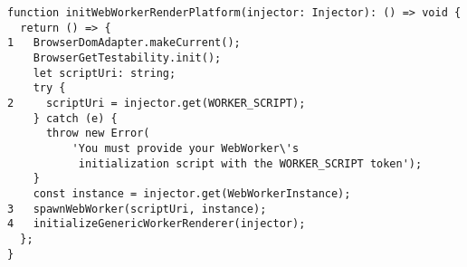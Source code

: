 \begin{verbatim}
function initWebWorkerRenderPlatform(injector: Injector): () => void {
  return () => {
1   BrowserDomAdapter.makeCurrent();
    BrowserGetTestability.init();
    let scriptUri: string;
    try {
2     scriptUri = injector.get(WORKER_SCRIPT);
    } catch (e) {
      throw new Error(
          'You must provide your WebWorker\'s
           initialization script with the WORKER_SCRIPT token');
    }
    const instance = injector.get(WebWorkerInstance);
3   spawnWebWorker(scriptUri, instance);
4   initializeGenericWorkerRenderer(injector);
  };
}
\end{verbatim}
